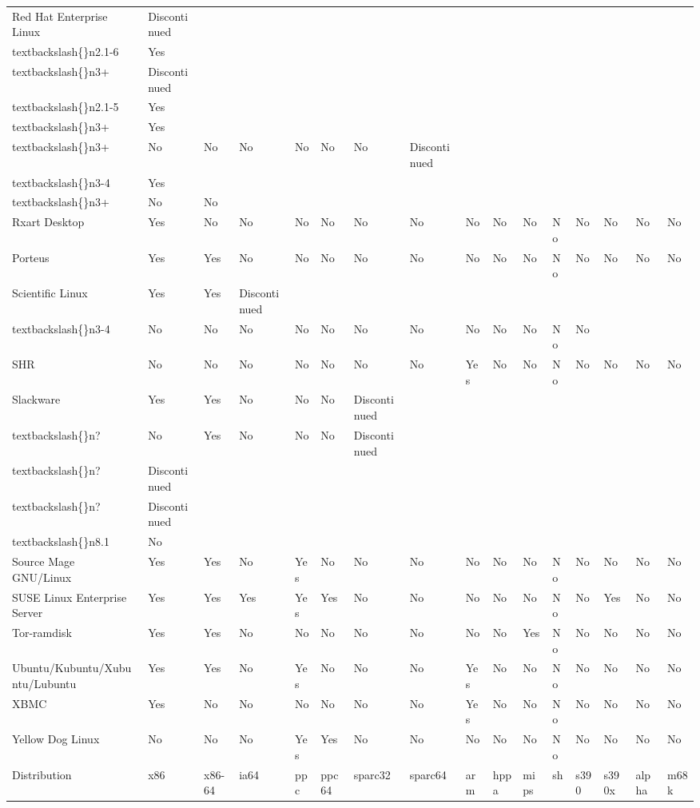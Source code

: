 \documentclass{article}
\begin{document}
\begin{tabular}{llllllllllllllll}
Red Hat Enterprise Linux & Discontinued\\textbackslash\{\}n2.1-6 & Yes\\textbackslash\{\}n3+ & Discontinued\\textbackslash\{\}n2.1-5 & Yes\\textbackslash\{\}n3+ & Yes\\textbackslash\{\}n3+ & No & No & No & No & No & No & Discontinued\\textbackslash\{\}n3-4 & Yes\\textbackslash\{\}n3+ & No & No \\
Rxart Desktop & Yes & No & No & No & No & No & No & No & No & No & No & No & No & No & No \\
Porteus & Yes & Yes & No & No & No & No & No & No & No & No & No & No & No & No & No \\
Scientific Linux & Yes & Yes & Discontinued\\textbackslash\{\}n3-4 & No & No & No & No & No & No & No & No & No & No & No & No \\
SHR & No & No & No & No & No & No & No & Yes & No & No & No & No & No & No & No \\
Slackware & Yes & Yes & No & No & No & Discontinued\\textbackslash\{\}n? & No & Yes & No & No & No & Discontinued\\textbackslash\{\}n? & Discontinued\\textbackslash\{\}n? & Discontinued\\textbackslash\{\}n8.1 & No \\
Source Mage GNU/Linux & Yes & Yes & No & Yes & No & No & No & No & No & No & No & No & No & No & No \\
SUSE Linux Enterprise Server & Yes & Yes & Yes & Yes & Yes & No & No & No & No & No & No & No & Yes & No & No \\
Tor-ramdisk & Yes & Yes & No & No & No & No & No & No & No & Yes & No & No & No & No & No \\
Ubuntu/Kubuntu/Xubuntu/Lubuntu & Yes & Yes & No & Yes & No & No & No & Yes & No & No & No & No & No & No & No \\
XBMC & Yes & No & No & No & No & No & No & Yes & No & No & No & No & No & No & No \\
Yellow Dog Linux & No & No & No & Yes & Yes & No & No & No & No & No & No & No & No & No & No \\
Distribution & x86 & x86-64 & ia64 & ppc & ppc64 & sparc32 & sparc64 & arm & hppa & mips & sh & s390 & s390x & alpha & m68k \\
\bottomrule
\end{tabular}
\end{document}
